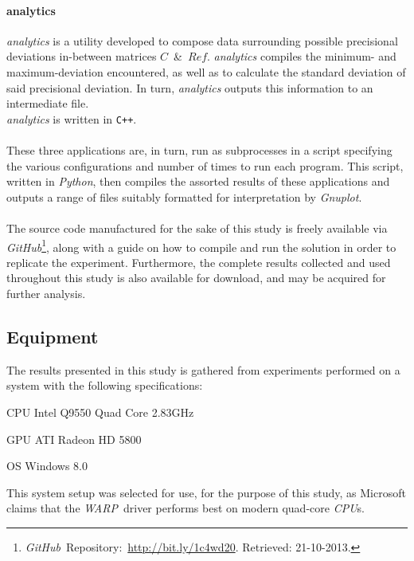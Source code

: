 \documentclass[fleqn,10pt]{SelfArx} %
\begin{document}
\paragraph{analytics}
\textit{analytics} is a utility developed to compose data surrounding possible precisional deviations in-between matrices $C$~\&~$Ref$. \textit{analytics} compiles the minimum- and maximum-deviation encountered, as well as to calculate the standard deviation of said precisional deviation. In turn, \textit{analytics} outputs this information to an intermediate file.\\
\textit{analytics} is written in \texttt{C++}.\\
\\
\noindent
These three applications are, in turn, run as subprocesses in a script specifying the various configurations and number of times to run each program. This script, written in \textit{Python}, then compiles the assorted results of these applications and outputs a range of files suitably formatted for interpretation by \textit{Gnuplot}.\\
\\
The source code manufactured for the sake of this study is freely available via \textit{GitHub}\footnote{\label{ftn:github}\textit{GitHub}~Repository:~\url{http://bit.ly/1c4wd20}. Retrieved: 21-10-2013.}, along with a guide on how to compile and run the solution in order to replicate the experiment. Furthermore, the complete results collected and used throughout this study is also available for download, and may be acquired for further analysis.

\subsection{Equipment}
\label{sec:contribution:equipment}
The results presented in this study is gathered from experiments performed on a system with the following specifications:
\begin{description*}
	\item[CPU]	Intel Q9550 Quad Core 2.83GHz
	\item[GPU]	ATI Radeon HD 5800
	\item[OS]	Windows 8.0
\end{description*}
This system setup was selected for use, for the purpose of this study, as Microsoft claims that the \textit{WARP}~driver performs best on modern quad-core \textit{CPU}s.
\end{document}
